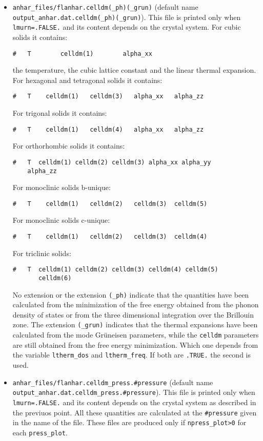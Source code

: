 \documentclass[12pt,a4paper,twoside]{report}
\begin{document}
\begin{itemize}
\item 
\texttt{anhar\_files/flanhar.celldm(\_ph)(\_grun)} 
(default name \\ \texttt{output\_anhar.dat.celldm(\_ph)(\_grun)}). 
This file is printed
only when \texttt{lmurn=.FALSE.} and its content depends on the crystal 
system. For cubic solids it contains: 
\begin{verbatim}
#   T        celldm(1)        alpha_xx
\end{verbatim}
the temperature, the cubic lattice constant and the linear thermal expansion.
For hexagonal and tetragonal solids it contains:
\begin{verbatim}
#   T    celldm(1)   celldm(3)   alpha_xx   alpha_zz
\end{verbatim}
For trigonal solids it contains:
\begin{verbatim}
#   T    celldm(1)   celldm(4)   alpha_xx   alpha_zz
\end{verbatim}
For orthorhombic solids it contains:
\begin{verbatim}
#   T  celldm(1) celldm(2) celldm(3) alpha_xx alpha_yy 
    alpha_zz
\end{verbatim}
For monoclinic solids b-unique:
\begin{verbatim}
#   T    celldm(1)   celldm(2)   celldm(3)  celldm(5)
\end{verbatim}
For monoclinic solids c-unique:
\begin{verbatim}
#   T    celldm(1)   celldm(2)   celldm(3)  celldm(4)
\end{verbatim}
For triclinic solids:
\begin{verbatim}
#   T  celldm(1) celldm(2) celldm(3) celldm(4) celldm(5) 
       celldm(6)
\end{verbatim}
No extension or the extension \texttt{(\_ph)} 
indicate that the quantities have been calculated from the minimization of
the free energy obtained from the phonon density of states or from the
three dimensional integration over the Brillouin zone. The extension
\texttt{(\_grun)} indicates that the thermal expansions have been
calculated from the mode Gr\"uneisen parameters, while the \texttt{celldm}
parameters are still obtained from the free energy minimization. Which
one depends from the variable \texttt{ltherm\_dos} and \texttt{ltherm\_freq}.
If both are \texttt{.TRUE.} the second is used.

\item 
\texttt{anhar\_files/flanhar.celldm\_press.\#pressure} 
(default name \\ \texttt{output\_anhar.dat.celldm\_press.\#pressure}). 
This file is printed
only when \texttt{lmurn=.FALSE.} and its content depends on the crystal 
system as described in the previuos point. 
All these quantities are calculated at the \texttt{\#pressure} given
in the name of the file.
These files are produced only if \texttt{npress\_plot>0} for each
\texttt{press\_plot}. 


\end{itemize}
\end{document}
